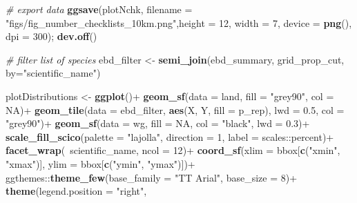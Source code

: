 \documentclass[]{article}
\newenvironment{Shaded}{}{}
\newcommand{\CommentTok}[1]{\textcolor[rgb]{0.38,0.63,0.69}{\textit{#1}}}
\newcommand{\DataTypeTok}[1]{\textcolor[rgb]{0.56,0.13,0.00}{#1}}
\newcommand{\DecValTok}[1]{\textcolor[rgb]{0.25,0.63,0.44}{#1}}
\newcommand{\FloatTok}[1]{\textcolor[rgb]{0.25,0.63,0.44}{#1}}
\newcommand{\KeywordTok}[1]{\textcolor[rgb]{0.00,0.44,0.13}{\textbf{#1}}}
\newcommand{\NormalTok}[1]{#1}
\newcommand{\OperatorTok}[1]{\textcolor[rgb]{0.40,0.40,0.40}{#1}}
\newcommand{\OtherTok}[1]{\textcolor[rgb]{0.00,0.44,0.13}{#1}}
\newcommand{\StringTok}[1]{\textcolor[rgb]{0.25,0.44,0.63}{#1}}
\begin{document}
\begin{Shaded}
\begin{Highlighting}[]
\CommentTok{# export data}
\KeywordTok{ggsave}\NormalTok{(plotNchk, }\DataTypeTok{filename =} \StringTok{"figs/fig_number_checklists_10km.png"}\NormalTok{,}\DataTypeTok{height =} \DecValTok{12}\NormalTok{,}
       \DataTypeTok{width =} \DecValTok{7}\NormalTok{, }\DataTypeTok{device =} \KeywordTok{png}\NormalTok{(), }\DataTypeTok{dpi =} \DecValTok{300}\NormalTok{); }\KeywordTok{dev.off}\NormalTok{()}

\CommentTok{# filter list of species}
\NormalTok{ebd_filter <-}\StringTok{ }\KeywordTok{semi_join}\NormalTok{(ebd_summary, grid_prop_cut, }\DataTypeTok{by=}\StringTok{"scientific_name"}\NormalTok{)}

\NormalTok{plotDistributions <-}
\KeywordTok{ggplot}\NormalTok{()}\OperatorTok{+}
\StringTok{  }\KeywordTok{geom_sf}\NormalTok{(}\DataTypeTok{data =}\NormalTok{ land, }\DataTypeTok{fill =} \StringTok{"grey90"}\NormalTok{, }\DataTypeTok{col =} \OtherTok{NA}\NormalTok{)}\OperatorTok{+}
\StringTok{  }\KeywordTok{geom_tile}\NormalTok{(}\DataTypeTok{data =}\NormalTok{ ebd_filter,}
            \KeywordTok{aes}\NormalTok{(X, Y, }\DataTypeTok{fill =}\NormalTok{ p_rep), }\DataTypeTok{lwd =} \FloatTok{0.5}\NormalTok{, }\DataTypeTok{col =} \StringTok{"grey90"}\NormalTok{)}\OperatorTok{+}
\StringTok{  }\KeywordTok{geom_sf}\NormalTok{(}\DataTypeTok{data =}\NormalTok{ wg, }\DataTypeTok{fill =} \OtherTok{NA}\NormalTok{, }\DataTypeTok{col =} \StringTok{"black"}\NormalTok{, }\DataTypeTok{lwd =} \FloatTok{0.3}\NormalTok{)}\OperatorTok{+}
\StringTok{  }
\StringTok{  }\KeywordTok{scale_fill_scico}\NormalTok{(}\DataTypeTok{palette =} \StringTok{"lajolla"}\NormalTok{, }\DataTypeTok{direction =} \DecValTok{1}\NormalTok{, }\DataTypeTok{label =}\NormalTok{ scales}\OperatorTok{::}\NormalTok{percent)}\OperatorTok{+}
\StringTok{  }\KeywordTok{facet_wrap}\NormalTok{(}\OperatorTok{~}\NormalTok{scientific_name, }\DataTypeTok{ncol =} \DecValTok{12}\NormalTok{)}\OperatorTok{+}
\StringTok{  }\KeywordTok{coord_sf}\NormalTok{(}\DataTypeTok{xlim =}\NormalTok{ bbox[}\KeywordTok{c}\NormalTok{(}\StringTok{"xmin"}\NormalTok{, }\StringTok{"xmax"}\NormalTok{)], }\DataTypeTok{ylim =}\NormalTok{ bbox[}\KeywordTok{c}\NormalTok{(}\StringTok{"ymin"}\NormalTok{, }\StringTok{"ymax"}\NormalTok{)])}\OperatorTok{+}
\StringTok{  }\NormalTok{ggthemes}\OperatorTok{::}\KeywordTok{theme_few}\NormalTok{(}\DataTypeTok{base_family =} \StringTok{"TT Arial"}\NormalTok{,}
                      \DataTypeTok{base_size =} \DecValTok{8}\NormalTok{)}\OperatorTok{+}
\StringTok{  }\KeywordTok{theme}\NormalTok{(}\DataTypeTok{legend.position =} \StringTok{"right"}\NormalTok{,}

\end{Highlighting}
\end{Shaded}
\end{document}
